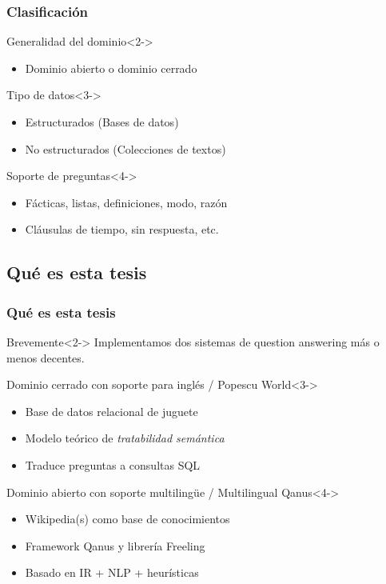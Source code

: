 \documentclass{beamer}
\begin{document}
\begin{frame}
  \frametitle{Clasificación}
  \begin{block}{Generalidad del dominio}<2->
    \begin{itemize}
      \item Dominio abierto o dominio cerrado
    \end{itemize}
  \end{block}
  \begin{block}{Tipo de datos}<3->
    \begin{itemize}
      \item Estructurados (Bases de datos)
      \item No estructurados (Colecciones de textos)
    \end{itemize}
  \end{block}
  \begin{block}{Soporte de preguntas}<4->
    \begin{itemize}
      \item Fácticas, listas, definiciones, modo, razón
      \item Cláusulas de tiempo, sin respuesta, etc.
    \end{itemize}
  \end{block}
\end{frame}


\subsection{Qué es esta tesis}

\begin{frame}
  \frametitle{Qué es esta tesis}
    \begin{block}{Brevemente}<2->
      Implementamos dos sistemas de question answering más o menos decentes.
    \end{block}
    \begin{exampleblock}{Dominio cerrado con soporte para inglés / Popescu World}<3->
      \begin{itemize}
          \item Base de datos relacional de juguete
          \item Modelo teórico de \textit{tratabilidad semántica}
          \item Traduce preguntas a consultas SQL
      \end{itemize}
    \end{exampleblock}
    \begin{alertblock}{Dominio abierto con soporte multilingüe / Multilingual Qanus}<4->
      \begin{itemize}
          \item Wikipedia(s) como base de conocimientos
          \item Framework Qanus y librería Freeling
          \item Basado en IR + NLP + heurísticas
      \end{itemize}
    \end{alertblock}
\end{frame}
\end{document}
